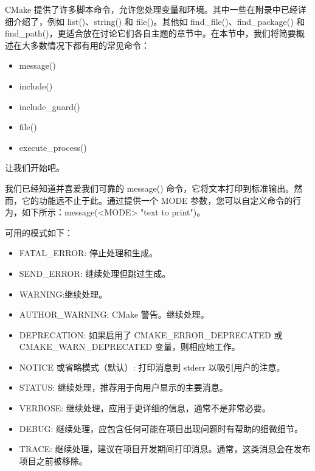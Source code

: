 
CMake 提供了许多脚本命令，允许您处理变量和环境。其中一些在附录中已经详细介绍了，例如 list()、string() 和 file()。其他如 find\_file()、find\_package() 和 find\_path()，更适合放在讨论它们各自主题的章节中。在本节中，我们将简要概述在大多数情况下都有用的常见命令：

\begin{itemize}
\item
message()

\item
include()

\item
include\_guard()

\item
file()

\item
execute\_process()
\end{itemize}

让我们开始吧。



我们已经知道并喜爱我们可靠的 message() 命令，它将文本打印到标准输出。然而，它的功能远不止于此。通过提供一个 MODE 参数，您可以自定义命令的行为，如下所示：message(<MODE> "text to print")。

可用的模式如下：

\begin{itemize}
\item
FATAL\_ERROR: 停止处理和生成。

\item
SEND\_ERROR: 继续处理但跳过生成。

\item
WARNING:继续处理。

\item
AUTHOR\_WARNING: CMake 警告。继续处理。

\item
DEPRECATION: 如果启用了 CMAKE\_ERROR\_DEPRECATED 或 CMAKE\_WARN\_DEPRECATED 变量，则相应地工作。

\item
NOTICE 或省略模式（默认）: 打印消息到 stderr 以吸引用户的注意。

\item
STATUS: 继续处理，推荐用于向用户显示的主要消息。

\item
VERBOSE: 继续处理，应用于更详细的信息，通常不是非常必要。

\item
DEBUG: 继续处理，应包含任何可能在项目出现问题时有帮助的细微细节。

\item
TRACE: 继续处理，建议在项目开发期间打印消息。通常，这类消息会在发布项目之前被移除。
\end{itemize}

